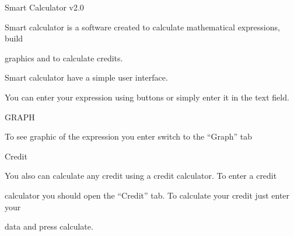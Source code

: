 \documentclass[a4paper,portrait,12pt]{article}
\begin{document}
\begin{flushleft}
Smart Calculator v2.0
\end{flushleft}


\begin{flushleft}
Smart calculator is a software created to calculate mathematical expressions, build
\end{flushleft}


\begin{flushleft}
graphics and to calculate credits.
\end{flushleft}


\begin{flushleft}
Smart calculator have a simple user interface.
\end{flushleft}





\begin{flushleft}
You can enter your expression using buttons or simply enter it in the text field.
\end{flushleft}





\begin{flushleft}
\newpage
\newpage
GRAPH
\end{flushleft}


\begin{flushleft}
To see graphic of the expression you enter switch to the {``}Graph'' tab
\end{flushleft}





\begin{flushleft}
\newpage
Credit
\end{flushleft}


\begin{flushleft}
You also can calculate any credit using a credit calculator. To enter a credit
\end{flushleft}


\begin{flushleft}
calculator you should open the {``}Credit'' tab. To calculate your credit just enter your
\end{flushleft}


\begin{flushleft}
data and press calculate.
\end{flushleft}





\newpage
\newpage
\end{document}
